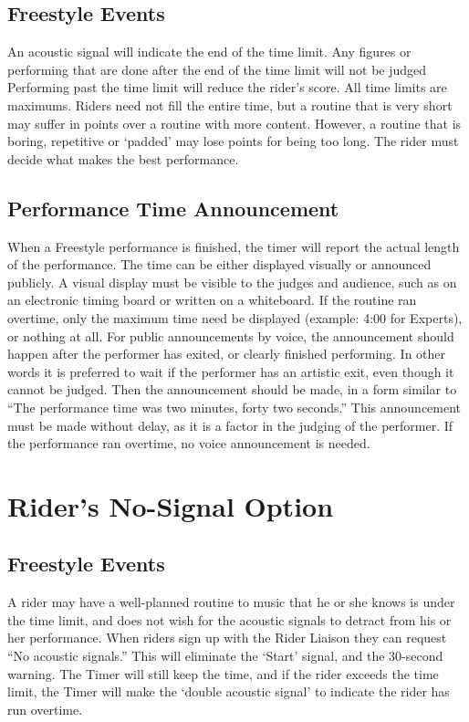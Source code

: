 \subsection{Freestyle Events}
An acoustic signal will indicate the end of the time limit.
Any figures or performing that are done after the end of the time limit will not be judged Performing past the time limit will reduce the rider's score.
All time limits are maximums.
Riders need not fill the entire time, but a routine that is very short may suffer in points over a routine with more content.
However, a routine that is boring, repetitive or `padded' may lose points for being too long.
The rider must decide what makes the best performance.

\subsection{Performance Time Announcement}
When a Freestyle performance is finished, the timer will report the actual length of the performance.
The time can be either displayed visually or announced publicly.
A visual display must be visible to the judges and audience, such as on an electronic timing board or written on a whiteboard.
If the routine ran overtime, only the maximum time need be displayed (example: 4:00 for Experts), or nothing at all.
For public announcements by voice, the announcement should happen after the performer has exited, or clearly finished performing.
In other words it is preferred to wait if the performer has an artistic exit, even though it cannot be judged.
Then the announcement should be made, in a form similar to ``The performance time was two minutes, forty two seconds.'' This announcement must be made without delay, as it is a factor in the judging of the performer.
If the performance ran overtime, no voice announcement is needed.

\section{Rider's No-Signal Option}

\subsection{Freestyle Events}
A rider may have a well-planned routine to music that he or she knows is under the time limit, and does not wish for the acoustic signals to detract from his or her performance.
When riders sign up with the Rider Liaison they can request ``No acoustic signals.'' This will eliminate the `Start' signal, and the 30-second warning.
The Timer will still keep the time, and if the rider exceeds the time limit, the Timer will make the `double acoustic signal' to indicate the rider has run overtime.

